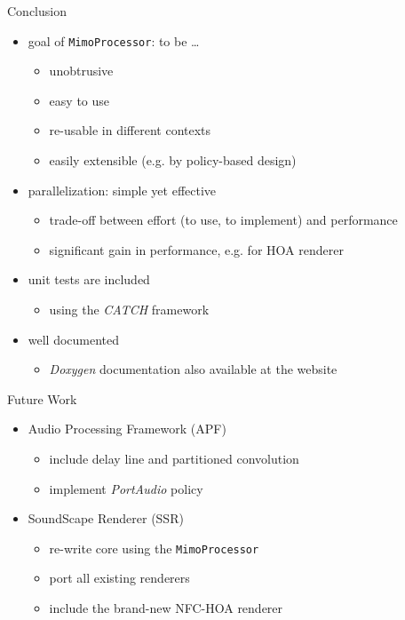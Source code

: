 \documentclass{beamer}
\newcommand{\code}{\texttt}
\begin{document}
\begin{frame}{Conclusion}

\begin{itemize}
\item goal of \code{MimoProcessor}: to be \dots
\begin{itemize}
\item unobtrusive
\item easy to use
\item re-usable in different contexts
\item easily extensible (e.g. by policy-based design)
\end{itemize}
\end{itemize}
\pause

\begin{itemize}
\item parallelization: simple yet effective
\begin{itemize}
\item trade-off between effort {\color{TUBblue}(to use, to implement)} and performance
\item significant gain in performance, e.g. for HOA renderer
\end{itemize}
\end{itemize}
\pause

\begin{itemize}
\item unit tests are included
\begin{itemize}
\item using the \emph{CATCH} framework
\end{itemize}
\item well documented
\begin{itemize}
\item \emph{Doxygen} documentation also available at the website
\end{itemize}
\end{itemize}

\end{frame}

\begin{frame}{Future Work}
\begin{itemize}
\item Audio Processing Framework (APF)
\begin{itemize}
\item include delay line and partitioned convolution
\item implement \emph{PortAudio} policy
\end{itemize}
\end{itemize}

\begin{itemize}
\item SoundScape Renderer (SSR)
\begin{itemize}
\item re-write core using the \code{MimoProcessor}
\item port all existing renderers
\item include the brand-new NFC-HOA renderer
\end{itemize}
\end{itemize}
\end{frame}
\end{document}
